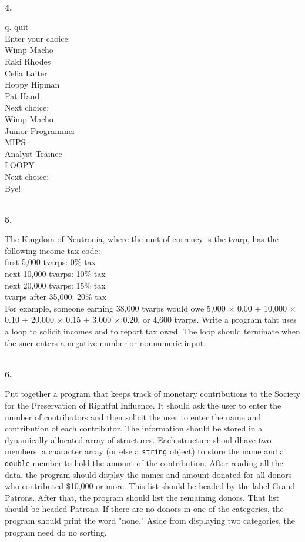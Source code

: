 \documentclass[10 pt]{amsart}
\newlength{\cwidth}
\newenvironment{cpart}[2][\cwidth]
	{\\ \phantom{\qquad}\textbf{#2. }\begin{minipage}[t]{#1}}
	{\end{minipage}}
\newcommand{\ttt}[1]{\texttt{#1}}
\newcommand{\ttb}[1]{\pmb{\texttt{#1}}}
\begin{document}
\begin{cpart}{4}
{\begin{tabbing}
				q. quit \\
				Enter your choice:\ttb{ a} \\
				Wimp Macho \\
				Raki Rhodes \\
				Celia Laiter \\
				Hoppy Hipman \\
				Pat Hand \\
				Next choice:\ttb{ d} \\
				Wimp Macho \\
				Junior Programmer \\
				MIPS \\
				Analyst Trainee \\
				LOOPY \\
				Next choice:\ttb{ q} \\
				Bye!
			\end{tabbing}
		}
	\end{cpart}
	\vspace{2ex}

	\begin{cpart}{5}
		The Kingdom of Neutronia, where the unit of currency is the
		tvarp, has the following income tax code: \vspace{2ex} \\
		first 5,000 tvarps: 0\% tax \\[2ex]
		next 10,000 tvarps: 10\% tax \\[2ex]
		next 20,000 tvarps: 15\% tax \\[2ex]
		tvarps after 35,000: 20\% tax \\[2ex]
		For example, someone earning 38,000 tvarps would owe
		5,000 $\times$ 0.00 + 10,000 $\times$ 0.10 +
		20,000 $\times$ 0.15 + 3,000 $\times$ 0.20, or 4,600 tvarps.
		Write a program taht uses a loop to solicit incomes and to report
		tax owed.
		The loop should terminate when the suer enters a negative
		number or nonnumeric input.
	\end{cpart}
	\vspace{2ex}

	\begin{cpart}{6}
		Put together a program that keeps track of monetary contributions
		to the Society for the Preservation of Rightful Influence.
		It should ask the user to enter the number of contributors
		and then solicit the user to enter the name and contribution
		of each contributor.
		The information should be stored in a dynamically allocated array
		of structures.
		Each structure shoul dhave two members: a character array
		(or else a \ttt{string} object) to store the name and a
		\ttt{double} member to hold the amount of the contribution.
		After reading all the data, the program should display the names
		and amount donated for all donors who contributed \$10,000 or
		more.
		This list should be headed by the label Grand Patrons.
		After that, the program should list the remaining donors.
		That list should be headed Patrons.
		If there are no donors in one of the categories, the program
		should print the word "none."
		Aside from displaying two categories, the program need do
		no sorting.
	\end{cpart}
	\vspace{2ex}
\end{document}
